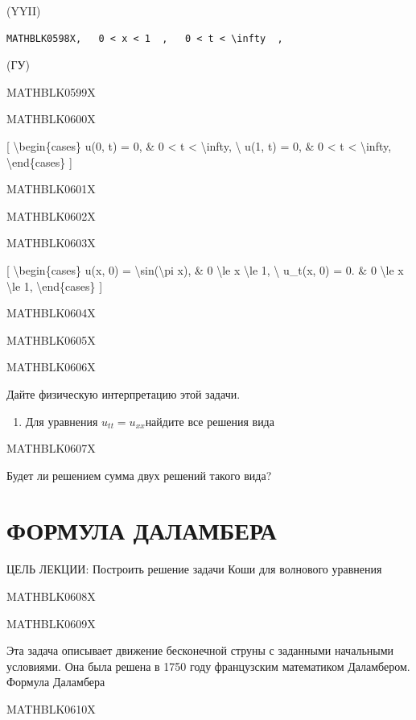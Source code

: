 \documentclass[
]{article}
\providecommand{\tightlist}{%
  \setlength{\itemsep}{0pt}\setlength{\parskip}{0pt}}
\begin{document}
(YYII)

\begin{verbatim}
MATHBLK0598X,   0 < x < 1  ,   0 < t < \infty  ,
\end{verbatim}

(ГУ)

MATHBLK0599X

MATHBLK0600X

{[} \textbackslash begin\{cases\} u(0, t) = 0, \& 0 \textless{} t
\textless{} \textbackslash infty, \textbackslash{} u(1, t) = 0, \& 0
\textless{} t \textless{} \textbackslash infty,
\textbackslash end\{cases\} {]}

MATHBLK0601X

MATHBLK0602X

MATHBLK0603X

{[} \textbackslash begin\{cases\} u(x, 0) =
\textbackslash sin(\textbackslash pi x), \& 0 \textbackslash le x
\textbackslash le 1, \textbackslash{} u\_t(x, 0) = 0. \& 0
\textbackslash le x \textbackslash le 1, \textbackslash end\{cases\} {]}

MATHBLK0604X

MATHBLK0605X

MATHBLK0606X

Дайте физическую интерпретацию этой задачи.

\begin{enumerate}
\def\labelenumi{\arabic{enumi}.}
\setcounter{enumi}{3}
\tightlist
\item
  Для уравнения \(u_{tt} = u_{xx}\)найдите все решения вида
\end{enumerate}

MATHBLK0607X

Будет ли решением сумма двух решений такого вида?

\section{ФОРМУЛА
ДАЛАМБЕРА}\label{ux444ux43eux440ux43cux443ux43bux430-ux434ux430ux43bux430ux43cux431ux435ux440ux430}

ЦЕЛЬ ЛЕКЦИИ: Построить решение задачи Коши для волнового уравнения

MATHBLK0608X

MATHBLK0609X

Эта задача описывает движение бесконечной струны с заданными начальными
условиями. Она была решена в 1750 году французским математиком
Даламбером. Формула Даламбера

MATHBLK0610X
\end{document}
